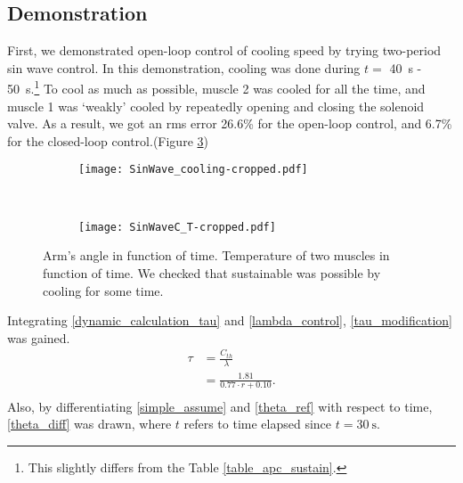 \subsection{\APC Demonstration}

First, we demonstrated open-loop control of cooling speed by trying two-period sin wave control. In this demonstration, cooling was done during $t=$ \SI{40}{\second} - \SI{50}{\second}.\footnote{This slightly differs from the Table \ref{table_apc_sustain}.} To cool as much as possible, muscle 2 was cooled for all the time, and muscle 1 was `weakly' cooled by repeatedly opening and closing the solenoid valve. As a result, we got an rms error 26.6\% for the open-loop control, and 6.7\% for the closed-loop control.(Figure \ref{sustain_demo})

\begin{figure}[t]
	\centering
	\begin{subfigure}[t]{0.45\textwidth}
		\texttt{[image: SinWave\_cooling-cropped.pdf]}
		\caption{\label{SinWave_cooling}}
	\end{subfigure}
	~
	\begin{subfigure}[t]{0.44\textwidth}
		\texttt{[image: SinWaveC\_T-cropped.pdf]}
		\caption{\label{Sinwave_C_T}}
	\end{subfigure}
	\caption[Sustainable open-loop \apc demonstration.]{ Arm's angle in function of time.  Temperature of two muscles in function of time. We checked that sustainable \apc was possible by cooling for some time.}
	\label{sustain_demo}
\end{figure}



Integrating \eqref{dynamic_calculation_tau} and \eqref{lambda_control}, \eqref{tau_modification} was gained.
\begin{equation} \label{tau_modification} 
\begin{aligned} 
\tau & = \frac{C_{th}}{\lambda} \\
& = \frac{1.81}{0.77\cdot r + 0.10}. \\ 
\end{aligned}
\end{equation}
Also, by differentiating \eqref{simple_assume} and \eqref{theta_ref} with respect to time, \eqref{theta_diff} was drawn, where $t$ refers to time elapsed since $t=\SI{30}{\second}$.

